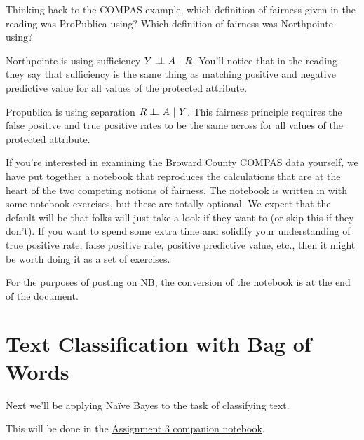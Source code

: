 \documentclass[assignment03_Solutions]{subfiles}
\begin{document}
\begin{exercise}[(10 minutes)]
Thinking back to the COMPAS example, which definition of fairness given in the reading was ProPublica using?  Which definition of fairness was Northpointe using?

\begin{boxedsolution}
\bi
\item Northpointe is using sufficiency $Y \perp\!\!\!\perp A~|~R$.  You'll notice that in the reading they say that sufficiency is the same thing as matching positive and negative predictive value for all values of the protected attribute.
\item Propublica is using separation $R \perp\!\!\!\perp A~|~Y$.  This fairness principle requires the false positive and true positive rates to be the same across for all values of the protected attribute.
\ei
\end{boxedsolution}
\end{exercise}

If you're interested in examining the Broward County COMPAS data yourself, we have put together \href{https://colab.research.google.com/github/mlfa19/assignments/blob/master/Module\%202/03/Exploring_COMPAS_Data.ipynb}{a notebook that reproduces the calculations that are at the heart of the two competing notions of fairness}.  The notebook is written in with some notebook exercises, but these are totally optional.  We expect that the default will be that folks will just take a look if they want to (or skip this if they don't). If you want to spend some extra time and solidify your understanding of true positive rate, false positive rate, positive predictive value, etc., then it might be worth doing it as a set of exercises.

For the purposes of posting on NB, the conversion of the notebook is at the end of the document.

\section{Text Classification with Bag of Words}
Next we'll be applying Na\"ive Bayes to the task of classifying text.

\begin{externalresources}[(60 minutes)]
This will be done in the \href{https://colab.research.google.com/github/mlfa19/assignments/blob/master/Module\%202/03/Assignment_3_Companion_Notebook.ipynb}{Assignment 3 companion notebook}.
\end{externalresources}
\end{document}
